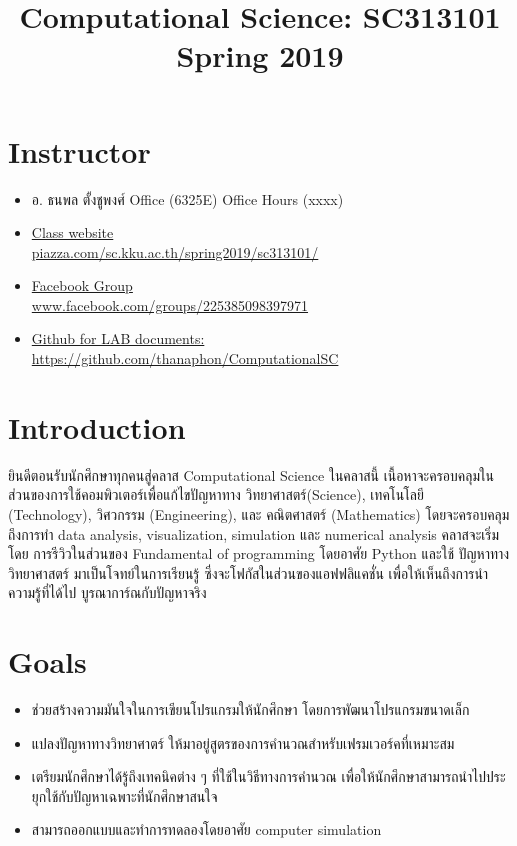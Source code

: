 \documentclass[12pt,a4paper]{article}
\title{Computational Science: SC313101 \\ Spring 2019}
\begin{document}
\maketitle 
\section{Instructor}
\begin{itemize}
	\item อ. ธนพล ตั้งชูพงศ์   Office (6325E)  Office Hours (xxxx)
	\item \href{ https://piazza.com/sc.kku.ac.th/spring2019/sc313101/} { Class website \\  piazza.com/sc.kku.ac.th/spring2019/sc313101/}
	
	\item \href{https://www.facebook.com/groups/225385098397971/}{ Facebook Group \\ www.facebook.com/groups/225385098397971 } 
	
	\item \href{https://github.com/thanaphon/ComputationalSC}{ Github for LAB documents: \\ https://github.com/thanaphon/ComputationalSC}
\end{itemize}
 





\section{Introduction}
	ยินดีตอนรับนักศึกษาทุกคนสู่คลาส Computational Science ในคลาสนี้ เนื้อหาจะครอบคลุมในส่วนของการใช้คอมพิวเตอร์เพื่อแก้ไขปัญหาทาง    วิทยาศาสตร์(Science), เทคโนโลยี (Technology), วิศวกรรม (Engineering), และ คณิตศาสตร์ (Mathematics)  โดยจะครอบคลุมถึงการทำ data analysis, visualization, simulation และ numerical analysis คลาสจะเริ่มโดย การรีวิวในส่วนของ Fundamental of programming โดยอาศัย Python  และใช้ ปัญหาทางวิทยาศาสตร์ มาเป็นโจทย์ในการเรียนรู้ ซึ่งจะโฟกัสในส่วนของแอฟฟลิแคชั่น เพื่อให้เห็นถึงการนำ ความรู้ที่ได้ไป บูรณาการ์ณกับปัญหาจริง        

\section{ Goals}
\begin{itemize}
	\item ช่วยสร้างความมันใจในการเขียนโปรแกรมให้นักศึกษา โดยการพัฒนาโปรแกรมขนาดเล็ก  
	\item แปลงปัญหาทางวิทยาศาตร์ ให้มาอยู่สูตรของการคำนวณสำหรับเฟรมเวอร์คที่เหมาะสม 
	\item เตรียมนักศึกษาได้รู้ถึงเทคนิคต่าง ๆ ที่ใช้ในวิธีทางการคำนวณ  เพื่อให้นักศึกษาสามารถนำไปประยุกใช้กับปัญหาเฉพาะที่นักศึกษาสนใจ 
	\item สามารถออกแบบและทำการทดลองโดยอาศัย computer simulation 
\end{itemize}
\end{document}
